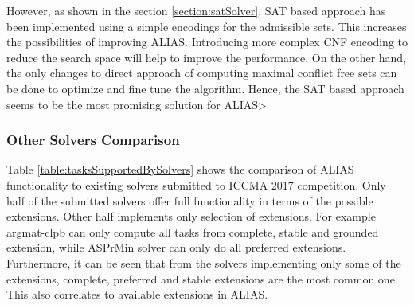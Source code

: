 However, as shown in the section \ref{section:satSolver}, SAT based approach has been implemented using a simple encodings for the admissible sets. This increases the possibilities of improving ALIAS. Introducing more complex CNF encoding to reduce the search space will help to improve the performance. On the other hand, the only changes to direct approach of computing maximal conflict free sets can be done to optimize and fine tune the algorithm. Hence, the SAT based approach seems to be the most promising solution for ALIAS>

\subsubsection{Other Solvers Comparison}
Table \ref{table:tasksSupportedBySolvers} shows the comparison of ALIAS functionality to existing solvers submitted to ICCMA 2017 competition. Only half of the submitted solvers offer full functionality in terms of the possible extensions. Other half implements only selection of extensions. For example argmat-clpb can only compute all tasks from complete, stable and grounded extension, while ASPrMin solver can only do all preferred extensions. Furthermore, it can be seen that from the solvers implementing only some of the extensions, complete, preferred and stable extensions are the most common one. This also correlates to available extensions in ALIAS.

